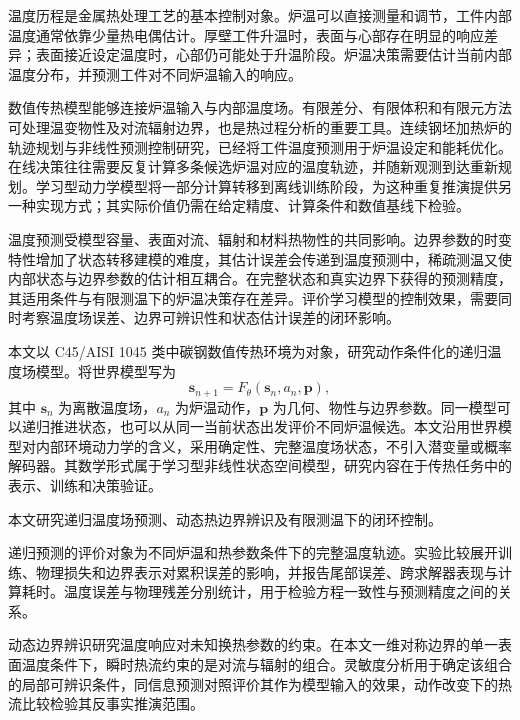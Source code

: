 

温度历程是金属热处理工艺的基本控制对象。炉温可以直接测量和调节，工件内部温度通常依靠少量热电偶估计。厚壁工件升温时，表面与心部存在明显的响应差异；表面接近设定温度时，心部仍可能处于升温阶段。炉温决策需要估计当前内部温度分布，并预测工件对不同炉温输入的响应。

数值传热模型能够连接炉温输入与内部温度场。有限差分、有限体积和有限元方法可处理温变物性及对流辐射边界，也是热过程分析的重要工具。连续钢坯加热炉的轨迹规划与非线性预测控制研究，已经将工件温度预测用于炉温设定和能耗优化\cite{steinboeck2011trajectory,steinboeck2013nmpc}。在线决策往往需要反复计算多条候选炉温对应的温度轨迹，并随新观测到达重新规划。学习型动力学模型将一部分计算转移到离线训练阶段，为这种重复推演提供另一种实现方式；其实际价值仍需在给定精度、计算条件和数值基线下检验。

温度预测受模型容量、表面对流、辐射和材料热物性的共同影响。边界参数的时变特性增加了状态转移建模的难度，其估计误差会传递到温度预测中，稀疏测温又使内部状态与边界参数的估计相互耦合。在完整状态和真实边界下获得的预测精度，其适用条件与有限测温下的炉温决策存在差异。评价学习模型的控制效果，需要同时考察温度场误差、边界可辨识性和状态估计误差的闭环影响。

本文以 C45/AISI 1045 类中碳钢数值传热环境为对象，研究动作条件化的递归温度场模型。将世界模型写为
\begin{equation}
  \bm{s}_{n+1}=F_{\theta}(\bm{s}_n,a_n,\bm{p}),
  \label{eq:wm_definition}
\end{equation}
其中 $\bm{s}_n$ 为离散温度场，$a_n$ 为炉温动作，$\bm{p}$ 为几何、物性与边界参数。同一模型可以递归推进状态，也可以从同一当前状态出发评价不同炉温候选。本文沿用世界模型对内部环境动力学的含义\cite{ha2018worldmodels}，采用确定性、完整温度场状态，不引入潜变量或概率解码器。其数学形式属于学习型非线性状态空间模型，研究内容在于传热任务中的表示、训练和决策验证。


本文研究递归温度场预测、动态热边界辨识及有限测温下的闭环控制。

递归预测的评价对象为不同炉温和热参数条件下的完整温度轨迹。实验比较展开训练、物理损失和边界表示对累积误差的影响，并报告尾部误差、跨求解器表现与计算耗时。温度误差与物理残差分别统计，用于检验方程一致性与预测精度之间的关系。

动态边界辨识研究温度响应对未知换热参数的约束。在本文一维对称边界的单一表面温度条件下，瞬时热流约束的是对流与辐射的组合。灵敏度分析用于确定该组合的局部可辨识条件，同信息预测对照评价其作为模型输入的效果，动作改变下的热流比较检验其反事实推演范围。

